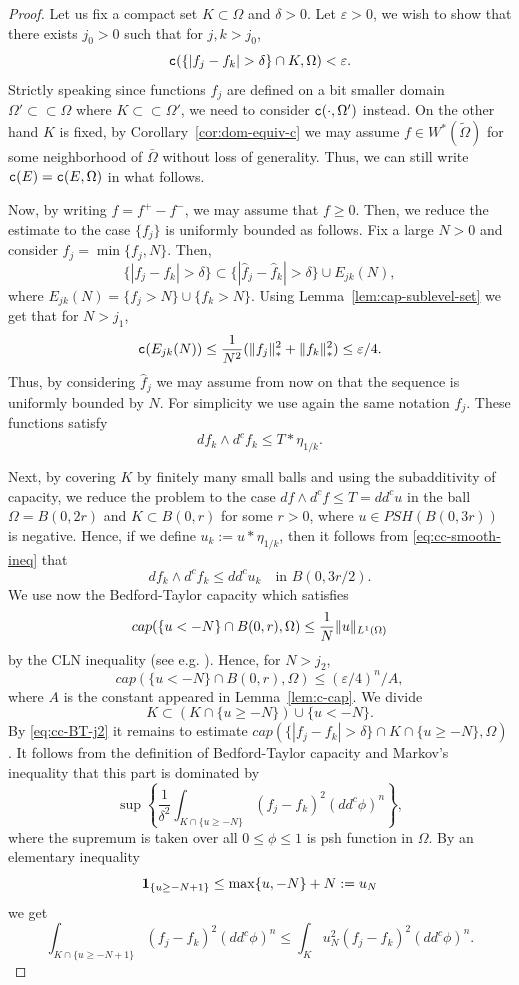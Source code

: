 \documentclass{amsart}
\newcommand{\wt}[1]{\widetilde{#1}}
\newcommand{\wh}[1]{\widehat{#1}}
\newcommand{\veps}{\varepsilon}
\newcommand{\de}{\delta}
\newcommand{\tc}{{\tt c}}
\newcommand{\Om}{\Omega}
\theoremstyle{definition}
\numberwithin{thm}{section}
\numberwithin{equation}{section}
\renewcommand{\[}{\begin{equation}}
\renewcommand{\]}{\end{equation}}
\newcommand{\wed}{\wedge}
\begin{document}
\begin{proof} Let us fix a compact set $K\subset \Om$ and $\de>0$. Let $\veps>0$, we wish to show that  there exists $j_0>0$ such that for $j, k>j_0$,
\[\label{eq:cc-goal}
	\tc (\{ |f_j -f_k| >\de\} \cap K,\Om) <\veps.
\]
Strictly speaking since functions $f_j$ are defined on a bit smaller domain $\Om'\subset\subset \Om$ where $K \subset \subset \Om'$, we need to consider $\tc (\cdot, \Om')$ instead. On the other hand $K$ is fixed,  by  Corollary~\ref{cor:dom-equiv-c} we may assume $f\in W^*(\wt\Om)$ for some neighborhood of $\bar\Om$  without loss of generality. Thus, we can still write $\tc(E) = \tc(E,\Om)$ in what follows.

Now, by writing $f = f^+ - f^-$, we may assume that $f\geq 0$. 
Then, we reduce the estimate to the case $\{f_j\}$ is uniformly bounded as follows. 
Fix a large $N>0$ and consider $\wh f_j = \min\{f_j, N\}$. Then,
$$
	\{| f_j - f_k |>\de\} \subset \{|\wh f_j -\wh f_k|>\de\} \cup E_{jk}(N),
$$
where
$E_{jk}(N) = \{ f_j > N\} \cup \{f_k > N\}.$
Using Lemma~\ref{lem:cap-sublevel-set} we get that for $N > j_1$,
\[\label{eq:cc-j1}
	\tc (E_{jk}(N)) \leq  \frac{1}{N^2} (\|f_j\|_*^2 + \|f_k\|_*^2) \leq \veps/4.
\]
Thus, 
by considering $\wh f_{j}$ we may assume from now on that the sequence is uniformly bounded by $N$. For simplicity we use again the same notation $f_j$. These functions satisfy 
\[\label{eq:cc-smooth-ineq}
	d f_k \wed d^c f_k \leq T*\eta_{1/k}.
\] 

Next, by covering $K$ by finitely many small balls and using the subadditivity of capacity, we reduce the problem to the case  $df \wed d^c f \leq T = dd^c u$ in the ball $\Om = B(0, 2r)$ and $K \subset B(0,r)$ for some $r>0$, where $u\in PSH(B(0,3r))$ is negative. Hence, if we define  $u_k:= u*\eta_{1/k}$, then it follows from \eqref{eq:cc-smooth-ineq} that
$$
	d f_k \wed d^c f_k \leq dd^c u_k  \quad \text{in } B(0, 3r/2).
$$
We use now the Bedford-Taylor capacity which satisfies 
\[\notag
	cap (\{u<-N\} \cap B(0,r) , \Om) \leq \frac{1}{N} \|u\|_{L^1(\Om)}
\]
by the CLN inequality (see e.g. \cite[Proposition~1.10]{ko05}). 
Hence, for $N>j_2$,
\[\label{eq:cc-BT-j2}
	cap (\{u<-N\} \cap B(0,r) , \Om) \leq (\veps/4)^n/A,
\]
 where $A$ is the constant appeared in Lemma~\ref{lem:c-cap}.
We divide 
$$ K \subset  (K \cap \{u\geq - N\}) \cup \{u<- N\}.$$
By \eqref{eq:cc-BT-j2} it remains to estimate $cap( \{| f_j - f_k| > \de\} \cap K \cap \{u \geq -N\}, \Om)$. It follows from the definition of Bedford-Taylor capacity and Markov's inequality that this part is dominated by
\[\label{eq:cc-BT-markova}
 \sup \left\{ \frac{1}{\de^2}\int_{K \cap \{u\geq -N\}}  (f_j -f_k)^2 (dd^c \phi)^n \right\},
\]
 where the supremum is taken over all $0\leq \phi \leq 1$ is psh function in $\Om$. %
 By an elementary inequality
$$
	{\bf 1}_{\{u\geq -N+1\}} \leq \max \{u, -N\} +N:= u_N
$$
we get
 $$
 	\int_{K\cap \{u\geq -N+1\}} (f_j-f_k)^2(dd^c\phi)^n \leq \int_K  u_N^2 (f_j-f_k)^2 (dd^c\phi)^n.
$$


\end{proof}
\end{document}
